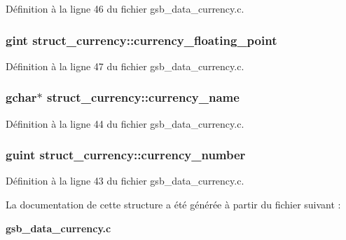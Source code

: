 Définition à la ligne 46 du fichier gsb\_\-data\_\-currency.c.

\subsubsection[{currency\_\-floating\_\-point}]{\setlength{\rightskip}{0pt plus 5cm}gint {\bf struct\_\-currency::currency\_\-floating\_\-point}}\label{structstruct__currency_a1c2cd0bf18b67c38a3bf1cad1d431ef6}


Définition à la ligne 47 du fichier gsb\_\-data\_\-currency.c.

\subsubsection[{currency\_\-name}]{\setlength{\rightskip}{0pt plus 5cm}gchar$\ast$ {\bf struct\_\-currency::currency\_\-name}}\label{structstruct__currency_a78401ab13f2c3352c9cc093f2ab64437}


Définition à la ligne 44 du fichier gsb\_\-data\_\-currency.c.

\subsubsection[{currency\_\-number}]{\setlength{\rightskip}{0pt plus 5cm}guint {\bf struct\_\-currency::currency\_\-number}}\label{structstruct__currency_a65173ce62bef52c81dca580f92330b5d}


Définition à la ligne 43 du fichier gsb\_\-data\_\-currency.c.



La documentation de cette structure a été générée à partir du fichier suivant :\begin{DoxyCompactItemize}
\item 
{\bf gsb\_\-data\_\-currency.c}\end{DoxyCompactItemize}
